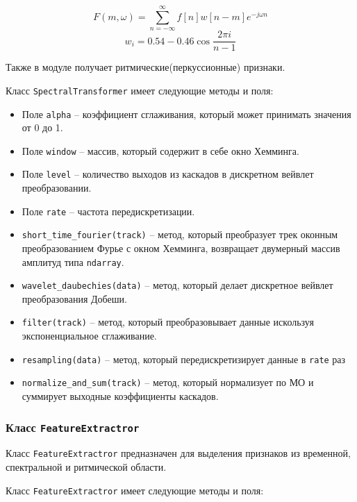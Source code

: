 \begin{equation}\label{eq:stft}
F(m, \omega) = \sum \limits_{n=-\infty}^{\infty} f[n]w[n-m]e^{-j \omega n} 
\end{equation}
\begin{equation}\label{eq:window}
w_i = 0.54 - 0.46 \cos\frac{2\pi i}{n-1}
\end{equation}

Также в модуле получает ритмические(перкуссионные) признаки. 

Класс \texttt{SpectralTransformer} имеет следующие методы и поля:

\begin{itemize}
\item{Поле \texttt{alpha} -- коэффициент сглаживания, который может принимать значения от 0 до 1.}
\item{Поле \texttt{window} -- массив, который содержит в себе окно Хемминга.}
\item{Поле \texttt{level} -- количество выходов из каскадов в дискретном вейвлет преобразовании. }
\item{Поле \texttt{rate} -- частота передискретизации.}
\item{\texttt{short\_time\_fourier(track)} -- метод, который преобразует трек оконным преобразованием Фурье с окном Хемминга, возвращает двумерный массив амплитуд типа \texttt{ndarray}. }
\item{\texttt{wavelet\_daubechies(data)} -- метод, который  делает дискретное вейвлет преобразования Добеши. }
\item{\texttt{filter(track)} -- метод, который преобразовывает данные искользуя экспоненциальное сглаживание.}
\item{\texttt{resampling(data)} -- метод, который передискретизирует данные в \texttt{rate} раз }
\item{\texttt{normalize\_and\_sum(track)} -- метод, который нормализует по МО и суммирует выходные коэффициенты каскадов.}
\end{itemize}

\subsubsection{Класс \texttt{FeatureExtractror}}

Класс \texttt{FeatureExtractror} предназначен для выделения признаков из временной, спектральной и ритмической области. 

Класс \texttt{FeatureExtractror} имеет следующие методы и поля:

